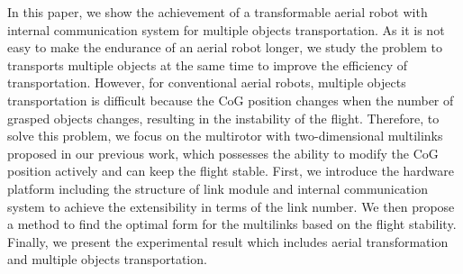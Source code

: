 In this paper, we show the achievement of a transformable aerial robot with internal communication system for multiple objects transportation. As it is not easy to make the endurance of an aerial robot longer, we study the problem to  transports multiple objects at the same time to improve the efficiency of transportation. However, for conventional aerial robots, multiple objects transportation is difficult because the CoG position changes when the number of grasped objects changes, resulting in the instability of the flight. Therefore, to solve this problem, we focus on the multirotor with two-dimensional multilinks proposed in our previous work, which possesses the ability to modify the CoG position actively and can keep the flight stable. First, we introduce the hardware platform including the structure of link module and internal communication system to achieve the extensibility in terms of the link number. We then propose a method to find the optimal form for the multilinks based on the flight stability. Finally, we present the experimental result which includes aerial transformation and multiple objects transportation.
